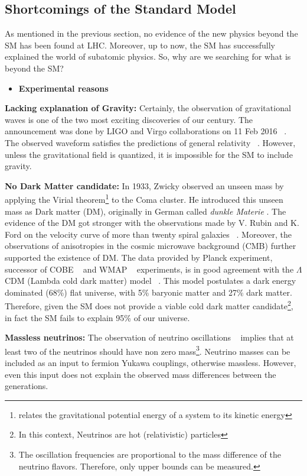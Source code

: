 \subsection{Shortcomings of the Standard Model}
\label{sec:shortcomingsOfSM}
As mentioned in the previous section, no evidence of the new physics beyond the SM has been found at LHC. Moreover, up to now, the SM has successfully explained the world of subatomic physics. So, why are we searching for what is beyond the SM?  
\begin{itemize}
  \item \textbf{Experimental reasons}
\end{itemize}

\textbf{Lacking explanation of Gravity:} Certainly, the observation of gravitational waves is one of the two most exciting discoveries of our century. The announcement was done by LIGO and Virgo collaborations on 11 Feb 2016 ~\cite{LigoVirgo}. The observed waveform satisfies the predictions of general relativity ~\cite{GR}.
However, unless the gravitational field is quantized, it is impossible for the SM to include gravity.

\textbf{No Dark Matter candidate:} In 1933, Zwicky observed an unseen mass by applying the Virial theorem\footnote{relates the gravitational potential energy of a system to its kinetic energy} to the Coma cluster. He introduced this unseen mass as Dark matter (DM), originally in German called \textit{dunkle Materie} \cite{DM1}. The evidence of the DM got stronger with the observations made by V. Rubin and K. Ford on the velocity curve of more than twenty spiral galaxies ~\cite{DM2}.  Moreover, the observations of anisotropies in the cosmic microwave background (CMB) further supported the existence of DM. The data provided by Planck experiment, successor of COBE ~\cite{DM4} and WMAP ~\cite{DM3} experiments, is in good agreement with the $\Lambda$CDM (Lambda cold dark matter) model ~\cite{DM5}. This model postulates a dark energy dominated (68\%) flat universe, with 5\% baryonic matter and 27\% dark matter. Therefore, given the SM does not provide a viable cold dark matter candidate\footnote{In this context, Neutrinos are hot (relativistic) particles}, in fact the SM fails to explain 95\% of our universe.

\textbf{Massless neutrinos:} The observation of neutrino oscillations ~\cite{Nu1,Nu2} implies that at least two of the neutrinos should have non zero mass\footnote{The oscillation frequencies are proportional to the mass difference of the neutrino flavors. Therefore, only upper bounds can be measured.}. Neutrino masses can be included as an input to fermion Yukawa couplings, otherwise massless. However, even this input does not explain the observed mass differences between the generations. 

